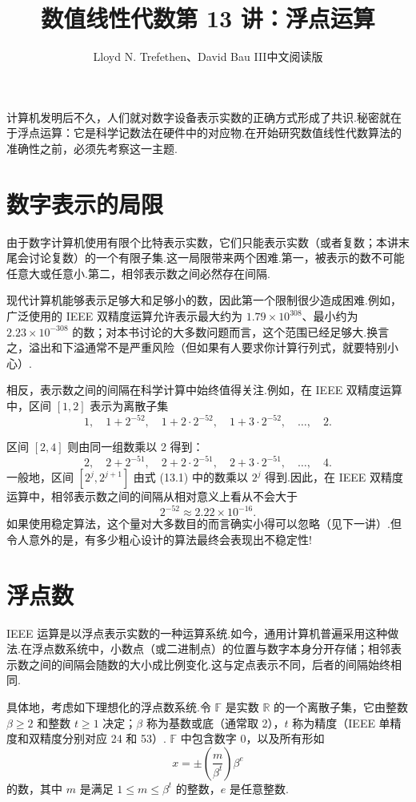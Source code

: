 \documentclass[UTF8,fontset=none,12pt]{ctexart}
\title{数值线性代数\quad 第 13 讲：浮点运算}
\author{Lloyd N. Trefethen、David Bau III\quad 中文阅读版}
\date{}
\newcommand{\R}{\mathbb{R}}
\newcommand{\F}{\mathbb{F}}
\theoremstyle{definition}
\begin{document}
\maketitle
\pagestyle{plain}

计算机发明后不久，人们就对数字设备表示实数的正确方式形成了共识.秘密就在于浮点运算：它是科学记数法在硬件中的对应物.在开始研究数值线性代数算法的准确性之前，必须先考察这一主题.

\section*{数字表示的局限}

由于数字计算机使用有限个比特表示实数，它们只能表示实数（或者复数；本讲末尾会讨论复数）的一个有限子集.这一局限带来两个困难.第一，被表示的数不可能任意大或任意小.第二，相邻表示数之间必然存在间隔.

现代计算机能够表示足够大和足够小的数，因此第一个限制很少造成困难.例如，广泛使用的 IEEE 双精度运算允许表示最大约为 $1.79\times10^{308}$、最小约为 $2.23\times10^{-308}$ 的数；对本书讨论的大多数问题而言，这个范围已经足够大.换言之，溢出和下溢通常不是严重风险（但如果有人要求你计算行列式，就要特别小心）.

相反，表示数之间的间隔在科学计算中始终值得关注.例如，在 IEEE 双精度运算中，区间 $[1,2]$ 表示为离散子集
\begin{equation}
    1,\quad 1+2^{-52},\quad 1+2\cdot2^{-52},\quad
    1+3\cdot2^{-52},\quad\ldots,\quad 2.
    \tag{13.1}
\end{equation}

区间 $[2,4]$ 则由同一组数乘以 2 得到：
\[
    2,\quad 2+2^{-51},\quad 2+2\cdot2^{-51},\quad
    2+3\cdot2^{-51},\quad\ldots,\quad 4.
\]
一般地，区间 $[2^j,2^{j+1}]$ 由式 (13.1) 中的数乘以 $2^j$ 得到.因此，在 IEEE 双精度运算中，相邻表示数之间的间隔从相对意义上看从不会大于
\[
    2^{-52}\approx2.22\times10^{-16}.
\]
如果使用稳定算法，这个量对大多数目的而言确实小得可以忽略（见下一讲）.但令人意外的是，有多少粗心设计的算法最终会表现出不稳定性!

\section*{浮点数}

IEEE 运算是以浮点表示实数的一种运算系统.如今，通用计算机普遍采用这种做法.在浮点数系统中，小数点（或二进制点）的位置与数字本身分开存储；相邻表示数之间的间隔会随数的大小成比例变化.这与定点表示不同，后者的间隔始终相同.

具体地，考虑如下理想化的浮点数系统.令 $\F$ 是实数 $\R$ 的一个离散子集，它由整数 $\beta\ge2$ 和整数 $t\ge1$ 决定；$\beta$ 称为基数或底（通常取 2），$t$ 称为精度（IEEE 单精度和双精度分别对应 24 和 53）. $\F$ 中包含数字 0，以及所有形如
\begin{equation}
    x=\pm\left(\frac{m}{\beta^t}\right)\beta^e
    \tag{13.2}
\end{equation}
的数，其中 $m$ 是满足 $1\le m\le\beta^t$ 的整数，$e$ 是任意整数.
\end{document}
